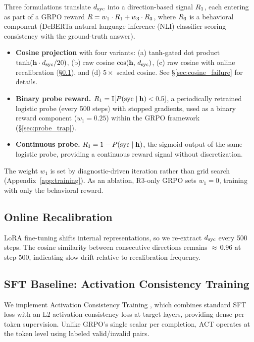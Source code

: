 Three formulations translate $d_{\text{syc}}$ into a direction-based signal $R_1$, each entering as part of a GRPO \citep{shao2024grpo} reward $R = w_1 \cdot R_1 + w_3 \cdot R_3$, where $R_3$ is a behavioral component (DeBERTa natural language inference (NLI) classifier scoring consistency with the ground-truth answer).
\begin{itemize}
\item[\textbf{F1}] \textbf{Cosine projection} with four variants: (a) tanh-gated dot product $\tanh(\mathbf{h} \cdot d_{\text{syc}} / 20)$, (b) raw cosine $\cos(\mathbf{h},\, d_{\text{syc}})$, (c) raw cosine with online recalibration (\S\ref{ssec:recalib}), and (d) $5{\times}$ scaled cosine. See \S\ref{sec:cosine_failure} for details.
\item[\textbf{F2}] \textbf{Binary probe reward.} $R_1 = \mathbb{I}[P(\text{syc} \mid \mathbf{h}) < 0.5]$, a periodically retrained logistic probe (every 500 steps) with stopped gradients, used as a binary reward component ($w_1{=}0.25$) within the GRPO framework (\S\ref{sec:probe_trap}).
\item[\textbf{F3}] \textbf{Continuous probe.} $R_1 = 1 - P(\text{syc} \mid \mathbf{h})$, the sigmoid output of the same logistic probe, providing a continuous reward signal without discretization.
\end{itemize}
The weight $w_1$ is set by diagnostic-driven iteration rather than grid search (Appendix~\ref{app:training}).
As an ablation, R3-only GRPO sets $w_1{=}0$, training with only the behavioral reward.

\subsection{Online Recalibration}
\label{ssec:recalib}

LoRA fine-tuning shifts internal representations, so we re-extract $d_{\text{syc}}$ every 500 steps.
The cosine similarity between consecutive directions remains ${\approx}\,0.96$ at step 500, indicating slow drift relative to recalibration frequency.

\subsection{SFT Baseline: Activation Consistency Training}
\label{ssec:baselines}

We implement Activation Consistency Training \citep[ACT;][]{consistency2025bctact}, which combines standard SFT loss with an L2 activation consistency loss at target layers, providing dense per-token supervision.
Unlike GRPO's single scalar per completion, ACT operates at the token level using labeled valid/invalid pairs.

